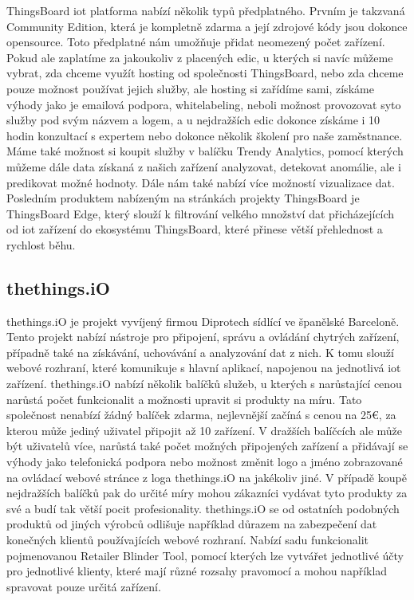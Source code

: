 ThingsBoard \acrshort{iot} platforma nabízí několik typů předplatného. Prvním je takzvaná Community Edition, která je kompletně zdarma a její zdrojové kódy jsou dokonce opensource. Toto předplatné nám umožňuje přidat neomezený počet zařízení. Pokud ale zaplatíme za jakoukoliv z placených edic, u kterých si navíc můžeme vybrat, zda chceme využít hosting od společnosti ThingsBoard, nebo zda chceme pouze možnost používat jejich služby, ale hosting si zařídíme sami, získáme výhody jako je emailová podpora, whitelabeling, neboli možnost provozovat syto služby pod svým názvem a logem, a u nejdražších edic dokonce získáme i 10 hodin konzultací s expertem nebo dokonce několik školení pro naše zaměstnance. Máme také možnost si koupit služby v balíčku Trendy Analytics, pomocí kterých můžeme dále data získaná z našich zařízení analyzovat, detekovat anomálie, ale i predikovat možné hodnoty. Dále nám také nabízí více možností vizualizace dat. Posledním produktem nabízeným na stránkách projekty ThingsBoard je ThingsBoard Edge, který slouží k filtrování velkého množství dat přicházejících od \acrshort{iot} zařízení do ekosystému ThingsBoard, které přinese větší přehlednost a rychlost běhu.

\subsection{thethings.iO}

thethings.iO je projekt vyvíjený firmou Diprotech sídlící ve španělské Barceloně. Tento projekt nabízí nástroje pro připojení, správu a ovládání chytrých zařízení, případně také na získávání, uchovávání a analyzování dat z nich. K tomu slouží webové rozhraní, které komunikuje s hlavní aplikací, napojenou na jednotlivá \acrshort{iot} zařízení. thethings.iO nabízí několik balíčků služeb, u kterých s narůstající cenou narůstá počet funkcionalit a možnosti upravit si produkty na míru. Tato společnost nenabízí žádný balíček zdarma, nejlevnější začíná s cenou na 25€, za kterou může jediný uživatel připojit až 10 zařízení. V dražších balíčcích ale může být uživatelů více, narůstá také počet možných připojených zařízení a přidávají se výhody jako telefonická podpora nebo možnost změnit logo a jméno zobrazované na ovládací webové stránce z loga thethings.iO na jakékoliv jiné. V případě koupě nejdražších balíčků pak do určité míry mohou zákazníci vydávat tyto produkty za své a budí tak větší pocit profesionality. thethings.iO se od ostatních podobných produktů od jiných výrobců odlišuje například důrazem na zabezpečení dat konečných klientů používajících webové rozhraní. Nabízí sadu funkcionalit pojmenovanou Retailer Blinder Tool, pomocí kterých lze vytvářet jednotlivé účty pro jednotlivé klienty, které mají různé rozsahy pravomocí a mohou například spravovat pouze určitá zařízení. 

